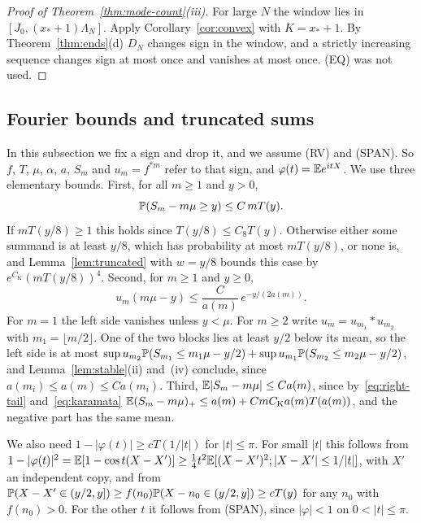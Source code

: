 \begin{proof}[Proof of Theorem~\ref{thm:mode-count}(iii)]
For large $N$ the window lies in $[J_0,(x_*+1)\Lambda_N]$. Apply Corollary~\ref{cor:convex} with
$K=x_*+1$. By Theorem~\ref{thm:ends}(d) $D_N$ changes sign in the window, and a strictly
increasing sequence changes sign at most once and vanishes at most once. (EQ) was not used.
\end{proof}

\subsection{Fourier bounds and truncated sums}\label{app:fourier}

In this subsection we fix a sign and drop it, and we assume (RV) and (SPAN). So $f$, $T$, $\mu$,
$\alpha$, $a$, $S_m$ and $u_m=f^{*m}$ refer to that sign, and $\varphi(t)=\mathbb{E} e^{itX}$. We use
three elementary bounds. First, for all $m\ge1$ and $y>0$,
\begin{equation}\label{eq:right-tail}
 \mathbb{P}(S_m-m\mu\ge y)\le C\,mT(y).
\end{equation}
If $mT(y/8)\ge1$ this holds since $T(y/8)\le C_8T(y)$. Otherwise either some summand is at least
$y/8$, which has probability at most $mT(y/8)$, or none is, and Lemma~\ref{lem:truncated} with
$w=y/8$ bounds this case by $e^{C_{\mathrm K}}(mT(y/8))^4$. Second, for $m\ge1$ and $y\ge0$,
\begin{equation}\label{eq:left-local}
 u_m(m\mu-y)\le\frac C{a(m)}\,e^{-y/(2a(m))}.
\end{equation}
For $m=1$ the left side vanishes unless $y<\mu$. For $m\ge2$ write $u_m=u_{m_1}*u_{m_2}$ with
$m_1=\lfloor m/2\rfloor$. One of the two blocks lies at least $y/2$ below its mean, so the left
side is at most $\sup u_{m_2}\mathbb{P}(S_{m_1}\le m_1\mu-y/2)+\sup u_{m_1}\mathbb{P}(S_{m_2}\le m_2\mu-y/2)$,
and Lemma~\ref{lem:stable}(ii) and~(iv) conclude, since $a(m_i)\le a(m)\le Ca(m_i)$. Third,
$\mathbb{E}|S_m-m\mu|\le Ca(m)$, since by~\eqref{eq:right-tail} and~\eqref{eq:karamata}
$\mathbb{E}(S_m-m\mu)_+\le a(m)+CmC_{\mathrm K}a(m)T(a(m))$, and the negative part has the same mean.

We also need $1-|\varphi(t)|\ge cT(1/|t|)$ for $|t|\le\pi$. For small $|t|$ this follows from
$1-|\varphi(t)|^2=\mathbb{E}[1-\cos t(X-X')]\ge\frac14t^2\mathbb{E}[(X-X')^2;|X-X'|\le1/|t|]$, with $X'$ an
independent copy, and from $\mathbb{P}(X-X'\in(y/2,y])\ge f(n_0)\mathbb{P}(X-n_0\in(y/2,y])\ge cT(y)$ for
any $n_0$ with $f(n_0)>0$. For the other $t$ it follows from (SPAN), since $|\varphi|<1$ on
$0<|t|\le\pi$.

